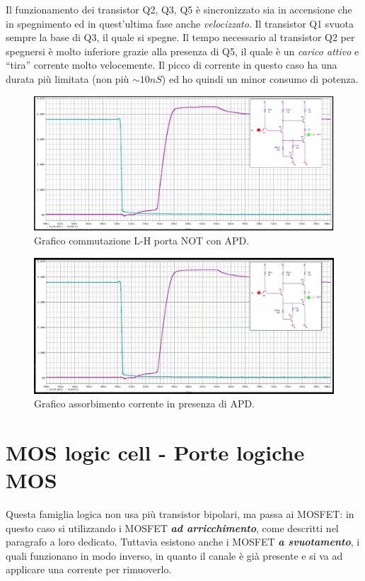 \documentclass[
]{book}
\begin{document}
Il funzionamento dei transistor Q2, Q3, Q5 è sincronizzato sia in
accensione che in spegnimento ed in quest'ultima fase anche
\emph{velocizzato}. Il transistor Q1 svuota sempre la base di Q3, il
quale si spegne. Il tempo necessario al transistor Q2 per spegnersi è
molto inferiore grazie alla presenza di Q5, il quale è un \emph{carico
attivo} e ``tira'' corrente molto velocemente. \newline Il picco di
corrente in questo caso ha una durata più limitata (non più
\(\sim 10nS\)) ed ho quindi un minor consumo di potenza.

\begin{figure}
\centering
\includegraphics[width=0.6\linewidth,height=\textheight,keepaspectratio]{assets/imgs/commutazione_l_h_apd.png}
\caption{Grafico commutazione L-H porta NOT con APD.}
\end{figure}

\begin{figure}
\centering
\includegraphics[width=0.6\linewidth,height=\textheight,keepaspectratio]{assets/imgs/corrente_apd.png}
\caption{Grafico assorbimento corrente in presenza di APD.}
\end{figure}

\section{MOS logic cell - Porte logiche
MOS}\label{mos-logic-cell---porte-logiche-mos}

Questa famiglia logica non usa più transistor bipolari, ma passa ai
MOSFET: in questo caso si utilizzando i MOSFET \textbf{\emph{ad
arricchimento}}, come descritti nel paragrafo a loro dedicato. Tuttavia
esistono anche i MOSFET \textbf{\emph{a svuotamento}}, i quali
funzionano in modo inverso, in quanto il canale è già presente e si va
ad applicare una corrente per rimuoverlo.
\end{document}
